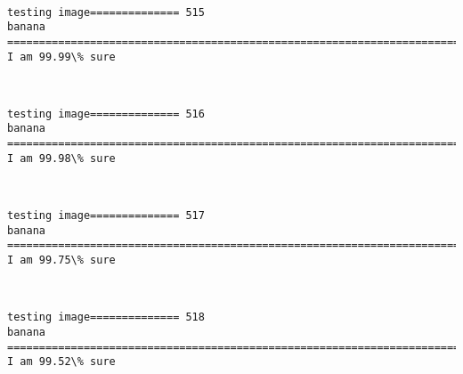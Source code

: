 \documentclass[11pt]{article}
\begin{document}
    \begin{center}
    \end{center}
    { \hspace*{\fill} \\}
    
    \begin{Verbatim}[commandchars=\\\{\}]
testing image============== 515
banana
============================================================================
I am 99.99\% sure

    \end{Verbatim}

    \begin{center}
    \end{center}
    { \hspace*{\fill} \\}
    
    \begin{Verbatim}[commandchars=\\\{\}]
testing image============== 516
banana
============================================================================
I am 99.98\% sure

    \end{Verbatim}

    \begin{center}
    \end{center}
    { \hspace*{\fill} \\}
    
    \begin{Verbatim}[commandchars=\\\{\}]
testing image============== 517
banana
============================================================================
I am 99.75\% sure

    \end{Verbatim}

    \begin{center}
    \end{center}
    { \hspace*{\fill} \\}
    
    \begin{Verbatim}[commandchars=\\\{\}]
testing image============== 518
banana
============================================================================
I am 99.52\% sure

    \end{Verbatim}
\end{document}
